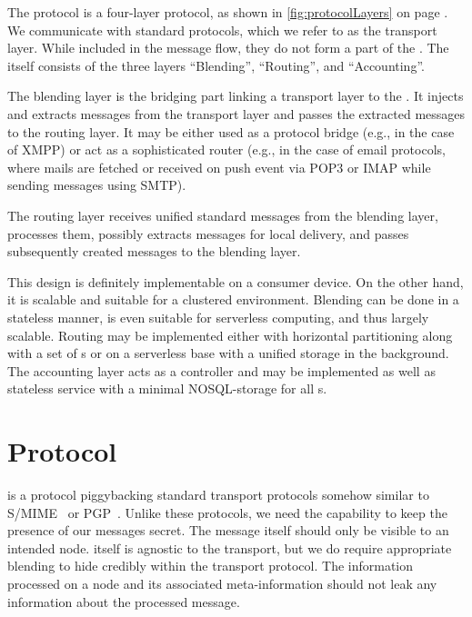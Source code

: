 The protocol is a four-layer protocol, as shown in \cref{fig:protocolLayers} on page \pageref{fig:protocolLayers}. We communicate with standard protocols, which we refer to as the transport layer. While included in the message flow, they do not form a part of the \VortexNode. The \VortexNode{} itself consists of the three layers ``Blending'', ``Routing'', and ``Accounting''.

The blending layer is the bridging part linking a transport layer to the \VortexNode{}. It injects and extracts messages from the transport layer and passes the extracted messages to the routing layer. It may be either used as a protocol bridge (e.g., in the case of XMPP) or act as a sophisticated router (e.g., in the case of email protocols, where mails are fetched or received on push event via POP3 or IMAP while sending messages using SMTP).

The routing layer receives unified standard messages from the blending layer, processes them, possibly extracts messages for local delivery, and passes subsequently created messages to the blending layer.

This design is definitely implementable on a consumer device. On the other hand, it is scalable and suitable for a clustered environment. Blending can be done in a stateless manner, is even suitable for serverless computing, and thus largely scalable. Routing may be implemented either with horizontal partitioning along with a set of s or on a serverless base with a unified storage in the background. The accounting layer acts as a controller and may be implemented as well as stateless service with a minimal NOSQL-storage for all s. 

\chapter{Protocol}\label{sec:protocol}
\MessageVortex{} is a protocol piggybacking standard transport protocols somehow similar to S/MIME~\cite{rfc2015} or PGP~\cite{PGP}. Unlike these protocols, we need the capability to keep the presence of our messages secret. The message itself should only be visible to an intended node.\MessageVortex{} itself is agnostic to the transport, but we do require appropriate blending to hide credibly within the transport protocol. The information processed on a node and its associated meta-information should not leak any information about the processed message. 

